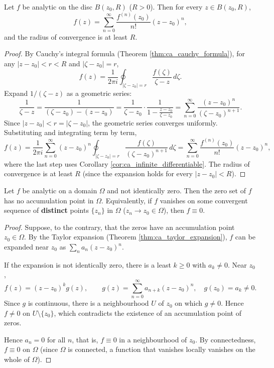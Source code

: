 \begin{theorem}\label{thm:ca_taylor_expansion}
Let $f$ be analytic on the disc $B(z_0, R)$ ($R > 0$). Then for every $z \in B(z_0, R)$,
\[
f(z) = \sum_{n=0}^{\infty} \frac{f^{(n)}(z_0)}{n!} (z - z_0)^n,
\]
and the radius of convergence is at least $R$.
\end{theorem}

\begin{proof}
By Cauchy's integral formula (Theorem \ref{thm:ca_cauchy_formula}), for any $|z - z_0| < r < R$ and $|\zeta - z_0| = r$,
\[
f(z) = \frac{1}{2\pi i} \oint_{|\zeta - z_0| = r} \frac{f(\zeta)}{\zeta - z} \, d\zeta.
\]
Expand $1/(\zeta - z)$ as a geometric series:
\[
\frac{1}{\zeta - z} = \frac{1}{(\zeta - z_0) - (z - z_0)} = \frac{1}{\zeta - z_0} \cdot \frac{1}{1 - \frac{z - z_0}{\zeta - z_0}} = \sum_{n=0}^{\infty} \frac{(z - z_0)^n}{(\zeta - z_0)^{n+1}}.
\]
Since $|z - z_0| < r = |\zeta - z_0|$, the geometric series converges uniformly. Substituting and integrating term by term,
\[
f(z) = \frac{1}{2\pi i} \sum_{n=0}^{\infty} (z - z_0)^n \oint_{|\zeta - z_0| = r} \frac{f(\zeta)}{(\zeta - z_0)^{n+1}} \, d\zeta = \sum_{n=0}^{\infty} \frac{f^{(n)}(z_0)}{n!} (z - z_0)^n,
\]
where the last step uses Corollary \ref{cor:ca_infinite_differentiable}. The radius of convergence is at least $R$ (since the expansion holds for every $|z - z_0| < R$).
\end{proof}

\begin{corollary}\label{cor:ca_zero_isolated}
Let $f$ be analytic on a domain $\Omega$ and not identically zero. Then the zero set of $f$ has no accumulation point in $\Omega$. Equivalently, if $f$ vanishes on some convergent sequence of \textbf{distinct} points $\{z_n\}$ in $\Omega$ ($z_n \to z_0 \in \Omega$), then $f \equiv 0$.
\end{corollary}

\begin{proof}
Suppose, to the contrary, that the zeros have an accumulation point $z_0 \in \Omega$. By the Taylor expansion (Theorem \ref{thm:ca_taylor_expansion}), $f$ can be expanded near $z_0$ as $\sum_n a_n (z - z_0)^n$.

If the expansion is not identically zero, there is a least $k \ge 0$ with $a_k \neq 0$. Near $z_0$,
\[
f(z) = (z - z_0)^k g(z), \qquad g(z) = \sum_{n=0}^{\infty} a_{n+k} (z - z_0)^n, \quad g(z_0) = a_k \neq 0.
\]
Since $g$ is continuous, there is a neighbourhood $U$ of $z_0$ on which $g \neq 0$. Hence $f \neq 0$ on $U \setminus \{z_0\}$, which contradicts the existence of an accumulation point of zeros.

Hence $a_n = 0$ for all $n$, that is, $f \equiv 0$ in a neighbourhood of $z_0$. By connectedness, $f \equiv 0$ on $\Omega$ (since $\Omega$ is connected, a function that vanishes locally vanishes on the whole of $\Omega$).
\end{proof}

